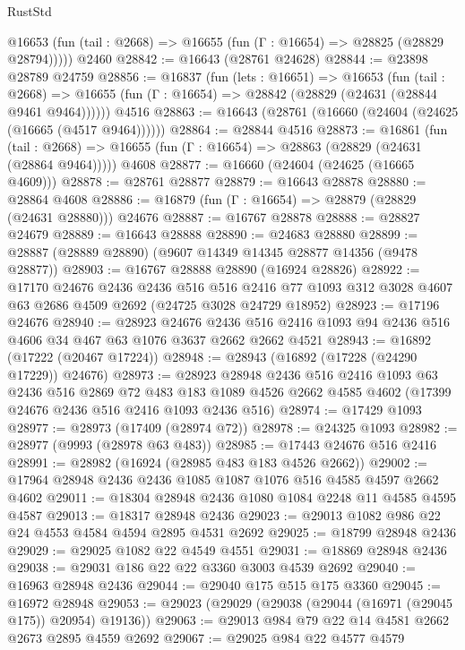 \begin{lexlean}{RustStd}
\begin{coremodule}
      @16653 (fun (tail : @2668) => @16655 (fun (Γ : @16654) => @28825 (@28829 @28794)))))
    @2460
@28842 := @16643 (@28761 @24628)
@28844 := @23898 @28789 @24759
@28856 := @16837
    (fun (lets : @16651) =>
    @16653
      (fun (tail : @2668) =>
      @16655 (fun (Γ : @16654) => @28842 (@28829 (@24631 (@28844 @9461 @9464))))))
    @4516
@28863 := @16643 (@28761 (@16660 (@24604 (@24625 (@16665 (@4517 @9464))))))
@28864 := @28844 @4516
@28873 := @16861
    (fun (tail : @2668) => @16655 (fun (Γ : @16654) => @28863 (@28829 (@24631 (@28864 @9464)))))
    @4608
@28877 := @16660 (@24604 (@24625 (@16665 @4609)))
@28878 := @28761 @28877
@28879 := @16643 @28878
@28880 := @28864 @4608
@28886 := @16879 (fun (Γ : @16654) => @28879 (@28829 (@24631 @28880))) @24676
@28887 := @16767 @28878
@28888 := @28827 @24679
@28889 := @16643 @28888
@28890 := @24683 @28880
@28899 := @28887 (@28889 @28890) (@9607 @14349 @14345 @28877 @14356 (@9478 @28877))
@28903 := @16767 @28888 @28890 (@16924 @28826)
@28922 := @17170
    @24676
    @2436
    @2436
    @516
    @516
    @2416
    @77
    @1093
    @312
    @3028
    @4607
    @63
    @2686
    @4509
    @2692
    (@24725 @3028 @24729 @18952)
@28923 := @17196 @24676
@28940 := @28923
    @24676
    @2436
    @516
    @2416
    @1093
    @94
    @2436
    @516
    @4606
    @34
    @467
    @63
    @1076
    @3637
    @2662
    @2662
    @4521
@28943 := @16892 (@17222 (@20467 @17224))
@28948 := @28943 (@16892 (@17228 (@24290 @17229)) @24676)
@28973 := @28923
    @28948
    @2436
    @516
    @2416
    @1093
    @63
    @2436
    @516
    @2869
    @72
    @483
    @183
    @1089
    @4526
    @2662
    @4585
    @4602
    (@17399 @24676 @2436 @516 @2416 @1093 @2436 @516)
@28974 := @17429 @1093
@28977 := @28973 (@17409 (@28974 @72))
@28978 := @24325 @1093
@28982 := @28977 (@9993 (@28978 @63 @483))
@28985 := @17443 @24676 @516 @2416
@28991 := @28982 (@16924 (@28985 @483 @183 @4526 @2662))
@29002 := @17964 @28948 @2436 @2436 @1085 @1087 @1076 @516 @4585 @4597 @2662 @4602
@29011 := @18304 @28948 @2436 @1080 @1084 @2248 @11 @4585 @4595 @4587
@29013 := @18317 @28948 @2436
@29023 := @29013 @1082 @986 @22 @24 @4553 @4584 @4594 @2895 @4531 @2692
@29025 := @18799 @28948 @2436
@29029 := @29025 @1082 @22 @4549 @4551
@29031 := @18869 @28948 @2436
@29038 := @29031 @186 @22 @22 @3360 @3003 @4539 @2692
@29040 := @16963 @28948 @2436
@29044 := @29040 @175 @515 @175 @3360
@29045 := @16972 @28948
@29053 := @29023 (@29029 (@29038 (@29044 (@16971 (@29045 @175)) @20954) @19136))
@29063 := @29013 @984 @79 @22 @14 @4581 @2662 @2673 @2895 @4559 @2692
@29067 := @29025 @984 @22 @4577 @4579

\end{coremodule}
\end{lexlean}
